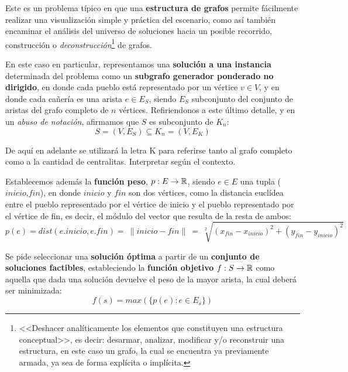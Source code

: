 \documentclass[11pt, a4paper, twoside]{article}
\begin{document}
{}


Este es un problema típico en que una \textbf{estructura de grafos} permite
fácilmente realizar una visualización simple y práctica del escenario, como
así también encaminar el análisis del universo de soluciones hacia un posible
recorrido, construcción o \emph{deconstrucción}\footnote{<<Deshacer
analíticamente los elementos que constituyen una estructura conceptual>>, es
decir: desarmar, analizar, modificar y/o reconstruir una estructura, en este
caso un grafo, la cual se encuentra ya previamente armada, ya sea de forma
explícita o implícita.} de grafos.

En este caso en particular, representamos una \textbf{solución a una instancia} determinada del
problema como un \textbf{subgrafo generador ponderado no dirigido}, en donde cada pueblo está
representado por un vértice $v \in V$, y en donde cada cañería es una arista $e \in E_{S}$, siendo
$E_{S}$ subconjunto del conjunto de aristas del grafo completo de $n$ vértices. Refiriendonos a este
último detalle, y en un \emph{abuso de notación}, afirmamos que $S$ es subconjunto de $K_{n}$:
%
    \[
    S = (V,E_{S}) \subseteq K_{n} = (V,E_{K})
    \]
%

\begin{aclaracion}

De aquí en adelante se utilizará la letra K para referirse tanto al grafo
completo como a la cantidad de centralitas. Interpretar según el contexto.

\end{aclaracion}


Establecemos además la \textbf{función peso}, $p: E \rightarrow \mathbb{R}$, siendo $e \in E$ una tupla
($inicio$,$fin$), en donde $inicio$ y $fin$ son dos vértices, como la distancia euclídea entre el
pueblo representado por el vértice de inicio y el pueblo representado por el vértice de fin, es
decir, el módulo del vector que resulta de la resta de ambos:
%
\[
  p(e) = dist(e.inicio, e.fin) =~\parallel inicio - fin \parallel ~=~ \sqrt[2]{(x_{fin}-x_{inicio})^{2}+(y_{fin}-y_{inicio})^{2}}
\]

\label{ej2-funcionobjetivo}

Se pide seleccionar una \textbf{solución óptima} a partir de un \textbf{conjunto de soluciones
factibles}, estableciendo la \textbf{función objetivo} $f: S \rightarrow \mathbb{R}$ como aquella que
dada una solución devuelve el peso de la mayor arista, la cual deberá ser minimizada:
%
\[
f(s) = max(\{p(e) : e \in E_{s}\})
\]
\end{document}
